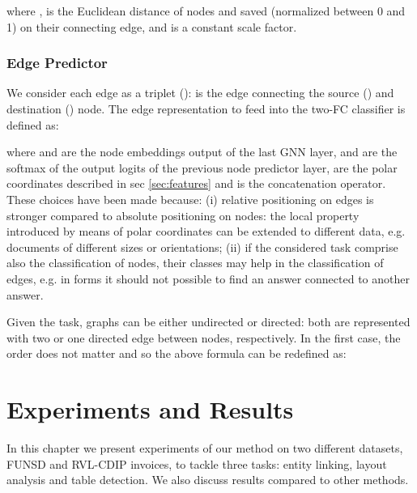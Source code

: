 \documentclass[runningheads]{llncs}
\begin{document}
where ,  is the Euclidean distance of nodes  and  saved (normalized between 0 and 1) on their connecting edge, and  is a constant scale factor.

\subsubsection{Edge Predictor}
\label{sec:edge-predictor}
We consider each edge as a triplet ():  is the edge connecting the source () and destination () node. 
The edge representation  to feed into the two-FC classifier is defined as:

where  and  are the node embeddings output of the last GNN layer,  and  are the softmax of the output logits of the previous node predictor layer,  are the polar coordinates described in sec \ref{sec:features} and  is the concatenation operator. These choices have been made because: (i) relative positioning on edges is stronger compared to absolute positioning on nodes: the local property introduced by means of polar coordinates can be extended to different data, e.g. documents of different sizes or orientations; (ii) if the considered task comprise also the classification of nodes, their classes may help in the classification of edges, e.g. in forms it should not possible to find an answer connected to another answer. 

Given the task, graphs can be either undirected or directed: both are represented with two or one directed edge between nodes, respectively. In the first case, the order does not matter and so the above formula can be redefined as:

 
\section{Experiments and Results}\label{s:results}
In this chapter we present experiments of our method on two different datasets, FUNSD and RVL-CDIP invoices, to tackle three tasks: entity linking, layout analysis and table detection. We also discuss results compared to other methods.
\end{document}
